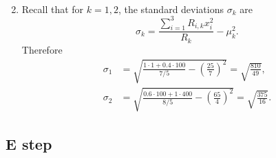 \documentclass{article}
\begin{document}
\begin{enumerate}
\begin{align*}
    \end{align*}
    \item Recall that for $k=1,2$, the standard deviations $\sigma_k$ are
    \[
        \sigma_k=\frac{\sum_{i=1}^3R_{i,k}x_i^2}{R_k} - \mu_k^2.
    \]
    Therefore
    \begin{align*}
        \sigma_1 &= \sqrt{\frac{1\cdot 1 + 0.4\cdot100}{7/5} -\left(\frac{25}{7}\right)^2} = \sqrt{\frac{810}{49}},\\
        \sigma_2 &= \sqrt{\frac{0.6\cdot 100+1\cdot400}{8/5}-\left(\frac{65}{4}\right)^2} = \sqrt{\frac{375}{16}}.
    \end{align*}
\end{enumerate}

\subsection{E step}
\end{document}
